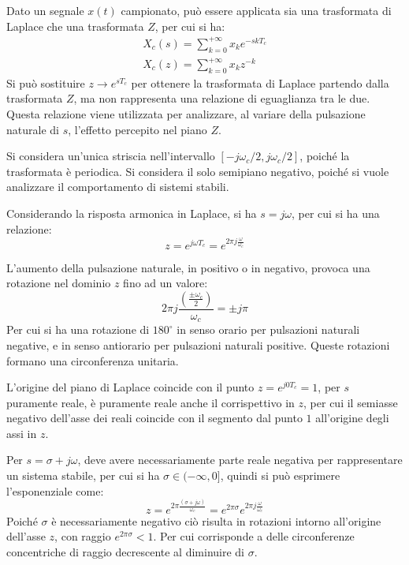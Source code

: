 \documentclass{article}
\numberwithin{equation}{subsection}
\begin{document}
Dato un segnale $x(t)$ campionato, può essere applicata sia una trasformata di Laplace che una trasformata $Z$, per 
cui si ha:
\begin{gather}
    X_c(s)=\sum_{k=0}^{+\infty}x_ke^{-skT_c}\\
    X_c(z)=\sum_{k=0}^{+\infty}x_kz^{-k}
\end{gather}
Si può sostituire $z\to e^{sT_c}$ per ottenere la trasformata di Laplace partendo dalla trasformata $Z$, ma non rappresenta una relazione di eguaglianza tra le due. 
Questa relazione viene utilizzata per analizzare, al variare della pulsazione naturale di $s$, l'effetto percepito nel piano $Z$. 

Si considera un'unica striscia nell'intervallo $\left[-j{\omega_c}/{2},j{\omega_c}/{2}\right]$, poiché la trasformata è periodica. Si considera il solo semipiano 
negativo, poiché si vuole analizzare il comportamento di sistemi stabili. 

Considerando la risposta armonica in Laplace, si ha $s=j\omega$, per cui si ha una relazione: 
\begin{equation*}
    z=e^{j\omega T_c}=e^{2\pi j\frac{\omega}{\omega_c}}
\end{equation*}

L'aumento della pulsazione naturale, in positivo o in negativo, 
provoca una rotazione nel dominio $z$ fino ad un valore: 
\begin{equation*}
    2\pi j\displaystyle\frac{\left(\frac{\pm\omega_c}{2}\right)}{\omega_c}=\pm j\pi
\end{equation*}    
Per cui si ha una rotazione di 
$180^{\circ}$ in senso orario per pulsazioni naturali negative, e in senso antiorario per pulsazioni naturali positive. Queste rotazioni formano una circonferenza 
unitaria. 

L'origine del piano di Laplace coincide con il punto $z=e^{j0T_c}=1$, per $s$ puramente reale, è puramente reale anche il corrispettivo in $z$, per cui il semiasse 
negativo dell'asse dei reali coincide con il segmento dal punto $1$ all'origine degli assi in $z$. 

Per $s=\sigma+j\omega$, deve avere necessariamente parte reale negativa per rappresentare un sistema stabile, per cui si ha $\sigma\in(-\infty,0]$, quindi si 
può esprimere l'esponenziale come:
\begin{equation*}
    z=e^{2\pi\frac{(\sigma+j\omega)}{\omega_c}}=e^{2\pi\sigma}e^{2\pi j\frac{\omega}{\omega_c}}
\end{equation*}
Poiché $\sigma$ è necessariamente negativo ciò risulta in rotazioni intorno all'origine dell'asse $z$, con raggio $e^{2\pi\sigma}<1$. Per cui corrisponde a delle 
circonferenze concentriche di raggio decrescente al diminuire di $\sigma$. 
\end{document}
